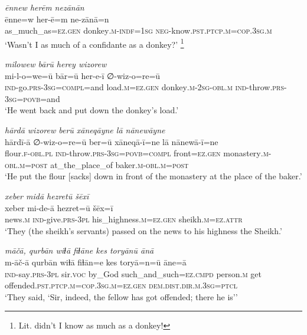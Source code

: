 \ea \label{HB.70}
\textit{ēnnew herēm nezānān} \\ 
\gll ēnne=w her-ē=m ne-zānā=n \\ 
 as\_much\_as\textsc{=ez}\textsc{.gen} donkey\textsc{.m}\textsc{-indf}\textsc{=1sg} \textsc{neg-}know\textsc{.pst}\textsc{.ptcp}\textsc{.m}\textsc{=cop}\textsc{.3sg}\textsc{.m} \\ 
\glt `Wasn’t I as much of a confidante as a donkey?' \footnote{Lit. didn’t I know as much as a donkey!}
\z 
 
\ea \label{HB.72}
\textit{milowew bārū herey wizorew} \\ 
\gll mi-l-o=we=ū bār=ū her-e-ī ∅-wiz-o=re=ū \\ 
 \textsc{ind-}go\textsc{.prs}\textsc{-3sg}\textsc{=\textsc{compl}}=and load\textsc{.m}\textsc{=ez}\textsc{.gen} donkey\textsc{.m}-\textsc{2sg}\textsc{-obl}\textsc{.m} \textsc{ind-}throw\textsc{.prs}\textsc{-3sg}\textsc{=\textsc{povb}}=and \\ 
\glt `He went back and put down the donkey’s load.'
\z 
 
\ea \label{HB.73}
\textit{hārdā wizorew berū xāneqāyne lā nānewāyne} \\ 
\gll hārdī-ā ∅-wiz-o=re=ū ber=ū xāneqā-ī=ne lā nānewā-ī=ne \\ 
 flour\textsc{\textsc{.f}}\textsc{-obl}\textsc{.pl} \textsc{ind-}throw\textsc{.prs}\textsc{-3sg}\textsc{=\textsc{povb}}=\textsc{compl} front\textsc{=ez}\textsc{.gen} monastery\textsc{.m}\textsc{-obl}\textsc{.m}\textsc{=\textsc{post}} at\_the\_place\_of baker\textsc{.m}\textsc{-obl}\textsc{.m}\textsc{=\textsc{post}} \\ 
\glt `He put the flour [sacks] down in front of the monastery at the place of the baker.'
\z 
 
\ea \label{HB.75}
\textit{xeber midā hezretū šēxī} \\ 
\gll xeber mi-de-ā hezret=ū šēx=ī \\ 
 news\textsc{.m} \textsc{ind-}give\textsc{.prs}\textsc{-3pl} his\_highness\textsc{.m}\textsc{=ez}\textsc{.gen} sheikh\textsc{.m}\textsc{=ez}.\textsc{attr} \\ 
\glt `They (the sheikh’s servants) passed on the news to his highness the Sheikh.'
\z 
 
\ea \label{HB.76}
\textit{māčā, qurbān wiɫā fiɫāne kes toryānū ānā} \\ 
\gll m-āč-ā qurbān wiɫā fiɫān=e kes toryā=n=ū āne=ā \\ 
 \textsc{ind-}say\textsc{.prs}\textsc{-3pl} sir.\textsc{voc} by\_God such\_and\_such\textsc{=ez}\textsc{.cmpd} person\textsc{.m} get offended\textsc{.pst}\textsc{.ptcp}\textsc{.m}\textsc{=cop}\textsc{.3sg}\textsc{.m}\textsc{=ez}\textsc{.gen} \textsc{dem.dist}\textsc{.dir}\textsc{.m}\textsc{.3sg}=\textsc{ptcl} \\ 
\glt `They said, ‘Sir, indeed, the fellow has got offended; there he is’'
\z 
 
